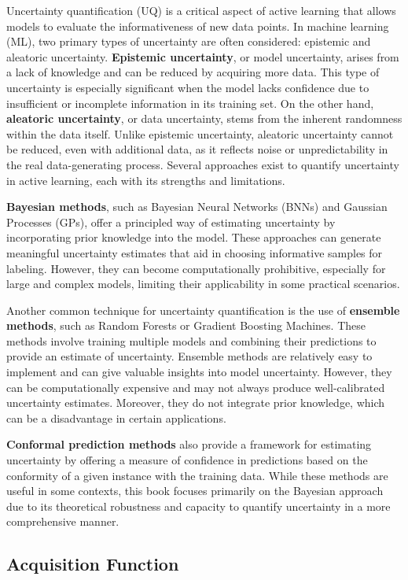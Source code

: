 \documentclass[
  letterpaper,
  numbers=noenddot,
  DIV=11]{scrreprt}
\theoremstyle{plain}
\theoremstyle{definition}
\theoremstyle{plain}
\theoremstyle{remark}
\begin{document}
Uncertainty quantification (UQ) is a critical aspect of active learning
that allows models to evaluate the informativeness of new data points.
In machine learning (ML), two primary types of uncertainty are often
considered: epistemic and aleatoric uncertainty. \textbf{Epistemic
uncertainty}, or model uncertainty, arises from a lack of knowledge and
can be reduced by acquiring more data. This type of uncertainty is
especially significant when the model lacks confidence due to
insufficient or incomplete information in its training set. On the other
hand, \textbf{aleatoric uncertainty}, or data uncertainty, stems from
the inherent randomness within the data itself. Unlike epistemic
uncertainty, aleatoric uncertainty cannot be reduced, even with
additional data, as it reflects noise or unpredictability in the real
data-generating process. Several approaches exist to quantify
uncertainty in active learning, each with its strengths and limitations.

\textbf{Bayesian methods}, such as Bayesian Neural Networks (BNNs) and
Gaussian Processes (GPs), offer a principled way of estimating
uncertainty by incorporating prior knowledge into the model. These
approaches can generate meaningful uncertainty estimates that aid in
choosing informative samples for labeling. However, they can become
computationally prohibitive, especially for large and complex models,
limiting their applicability in some practical scenarios.

Another common technique for uncertainty quantification is the use of
\textbf{ensemble methods}, such as Random Forests or Gradient Boosting
Machines. These methods involve training multiple models and combining
their predictions to provide an estimate of uncertainty. Ensemble
methods are relatively easy to implement and can give valuable insights
into model uncertainty. However, they can be computationally expensive
and may not always produce well-calibrated uncertainty estimates.
Moreover, they do not integrate prior knowledge, which can be a
disadvantage in certain applications.

\textbf{Conformal prediction methods} also provide a framework for
estimating uncertainty by offering a measure of confidence in
predictions based on the conformity of a given instance with the
training data. While these methods are useful in some contexts, this
book focuses primarily on the Bayesian approach due to its theoretical
robustness and capacity to quantify uncertainty in a more comprehensive
manner.

\subsection{Acquisition Function}\label{acquisition-function}
\end{document}
